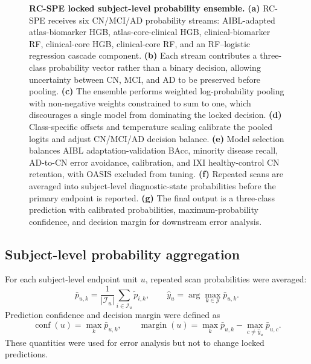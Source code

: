 \begin{figure}[p]
    \centering
    \caption{\textbf{RC-SPE locked subject-level probability ensemble.} \textbf{(a)} RC-SPE receives six CN/MCI/AD probability streams: AIBL-adapted atlas-biomarker HGB, atlas-core-clinical HGB, clinical-biomarker RF, clinical-core HGB, clinical-core RF, and an RF--logistic regression cascade component. \textbf{(b)} Each stream contributes a three-class probability vector rather than a binary decision, allowing uncertainty between CN, MCI, and AD to be preserved before pooling. \textbf{(c)} The ensemble performs weighted log-probability pooling with non-negative weights constrained to sum to one, which discourages a single model from dominating the locked decision. \textbf{(d)} Class-specific offsets and temperature scaling calibrate the pooled logits and adjust CN/MCI/AD decision balance. \textbf{(e)} Model selection balances AIBL adaptation-validation BAcc, minority disease recall, AD-to-CN error avoidance, calibration, and IXI healthy-control CN retention, with OASIS excluded from tuning. \textbf{(f)} Repeated scans are averaged into subject-level diagnostic-state probabilities before the primary endpoint is reported. \textbf{(g)} The final output is a three-class prediction with calibrated probabilities, maximum-probability confidence, and decision margin for downstream error analysis.}
    \label{fig:v6_model}
\end{figure}

\subsection{Subject-level probability aggregation}
\label{sec:subject_aggregation}

For each subject-level endpoint unit $u$, repeated scan probabilities were averaged:
\begin{equation}
\bar{p}_{u,k} =
\frac{1}{|\mathcal{I}_u|}
\sum_{i\in\mathcal{I}_u}\tilde{p}_{i,k},
\qquad
\hat{y}_u = \arg\max_{k\in\mathcal{Y}}\bar{p}_{u,k}.
\label{eq:v6_subject_average}
\end{equation}
Prediction confidence and decision margin were defined as
\begin{equation}
\operatorname{conf}(u)=\max_k \bar{p}_{u,k},
\qquad
\operatorname{margin}(u)=
\max_k \bar{p}_{u,k}
-
\max_{c\neq \hat{y}_u}\bar{p}_{u,c}.
\label{eq:confidence_margin}
\end{equation}
These quantities were used for error analysis but not to change locked predictions.

